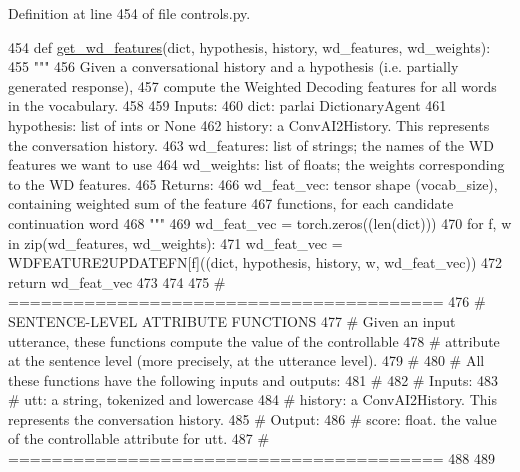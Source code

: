 Definition at line 454 of file controls.\+py.


\begin{DoxyCode}
454 \textcolor{keyword}{def }\hyperlink{namespaceprojects_1_1controllable__dialogue_1_1controllable__seq2seq_1_1controls_a0324491b8ecb07aaf415e47d6575cbac}{get\_wd\_features}(dict, hypothesis, history, wd\_features, wd\_weights):
455     \textcolor{stringliteral}{"""}
456 \textcolor{stringliteral}{    Given a conversational history and a hypothesis (i.e. partially generated response),}
457 \textcolor{stringliteral}{    compute the Weighted Decoding features for all words in the vocabulary.}
458 \textcolor{stringliteral}{}
459 \textcolor{stringliteral}{    Inputs:}
460 \textcolor{stringliteral}{        dict: parlai DictionaryAgent}
461 \textcolor{stringliteral}{        hypothesis: list of ints or None}
462 \textcolor{stringliteral}{        history: a ConvAI2History. This represents the conversation history.}
463 \textcolor{stringliteral}{        wd\_features: list of strings; the names of the WD features we want to use}
464 \textcolor{stringliteral}{        wd\_weights: list of floats; the weights corresponding to the WD features.}
465 \textcolor{stringliteral}{    Returns:}
466 \textcolor{stringliteral}{        wd\_feat\_vec: tensor shape (vocab\_size), containing weighted sum of the feature}
467 \textcolor{stringliteral}{          functions, for each candidate continuation word}
468 \textcolor{stringliteral}{    """}
469     wd\_feat\_vec = torch.zeros((len(dict)))
470     \textcolor{keywordflow}{for} f, w \textcolor{keywordflow}{in} zip(wd\_features, wd\_weights):
471         wd\_feat\_vec = WDFEATURE2UPDATEFN[f]((dict, hypothesis, history, w, wd\_feat\_vec))
472     \textcolor{keywordflow}{return} wd\_feat\_vec
473 
474 
475 \textcolor{comment}{# ========================================}
476 \textcolor{comment}{# SENTENCE-LEVEL ATTRIBUTE FUNCTIONS}
477 \textcolor{comment}{# Given an input utterance, these functions compute the value of the controllable}
478 \textcolor{comment}{# attribute at the sentence level (more precisely, at the utterance level).}
479 \textcolor{comment}{#}
480 \textcolor{comment}{# All these functions have the following inputs and outputs:}
481 \textcolor{comment}{#}
482 \textcolor{comment}{# Inputs:}
483 \textcolor{comment}{#   utt: a string, tokenized and lowercase}
484 \textcolor{comment}{#   history: a ConvAI2History. This represents the conversation history.}
485 \textcolor{comment}{# Output:}
486 \textcolor{comment}{#   score: float. the value of the controllable attribute for utt.}
487 \textcolor{comment}{# ========================================}
488 
489 
\end{DoxyCode}
